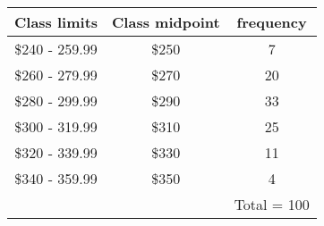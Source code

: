 \documentclass[]{report}
\begin{document}
\begin{tabular}{|c|c|c|}
	\hline
	Class limits& Class midpoint & frequency \\
	\hline
	\$240 - 259.99 & \$250 &7\\
	\$260 - 279.99 & \$270 &20\\
	\$280 - 299.99 & \$290 &33\\
	\$300 - 319.99 & \$310 &25\\
	\$320 - 339.99 & \$330 &11\\
	\$340 - 359.99 & \$350 &4\\
	\hline
	& & Total = 100\\
	\hline
\end{tabular}
\end{document}
